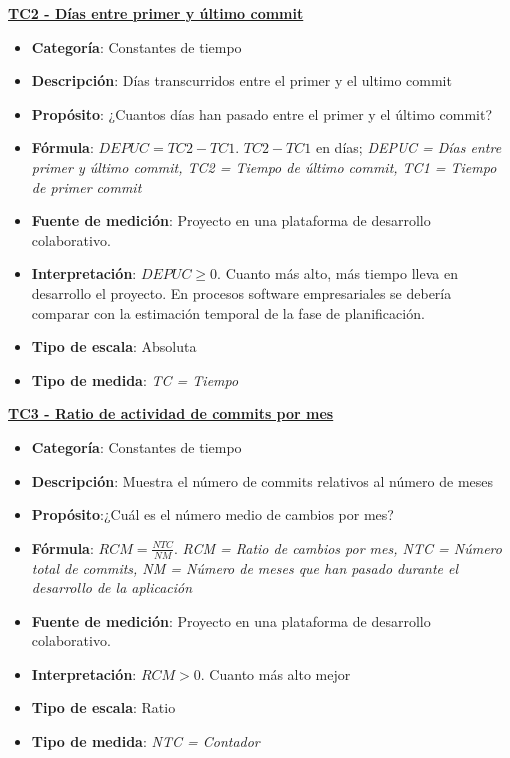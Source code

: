 \textbf{\underline{TC2 - Días entre primer y último commit}}

\begin{itemize}
	\item \textbf{Categoría}: Constantes de tiempo
	\item \textbf{Descripción}: Días transcurridos entre el primer y el ultimo commit 
	\item \textbf{Propósito}: ¿Cuantos días han pasado entre el primer y el último commit?
	\item \textbf{Fórmula}: $DEPUC = TC2- TC1$. $TC2- TC1$ en días;  \textit{DEPUC = Días entre primer y último commit, TC2 = Tiempo de último commit, TC1 = Tiempo de primer commit}
	\item \textbf{Fuente de medición}: Proyecto en una plataforma de desarrollo colaborativo.
	\item \textbf{Interpretación}: $DEPUC \geq 0$. Cuanto más alto, más tiempo lleva en desarrollo el proyecto. En procesos software empresariales se debería comparar con la estimación temporal de la fase de planificación. 
	\item \textbf{Tipo de escala}: Absoluta
	\item \textbf{Tipo de medida}: \textit{TC = Tiempo}
\end{itemize}

\textbf{\underline{TC3 - Ratio de actividad de commits por mes}}

\begin{itemize}
	\item \textbf{Categoría}: Constantes de tiempo
	\item \textbf{Descripción}: Muestra el número de commits relativos al número de meses
	\item \textbf{Propósito}:¿Cuál es el número medio de cambios por mes?
	\item \textbf{Fórmula}: $RCM = \frac{NTC}{NM}$. \textit{RCM = Ratio de cambios por mes, NTC = Número total de commits, NM = Número de meses que han pasado durante el desarrollo de la aplicación}
	\item \textbf{Fuente de medición}: Proyecto en una plataforma de desarrollo colaborativo.
	\item \textbf{Interpretación}: $RCM > 0$. Cuanto más alto mejor
	\item \textbf{Tipo de escala}: Ratio
	\item \textbf{Tipo de medida}: \textit{NTC = Contador}
\end{itemize}

